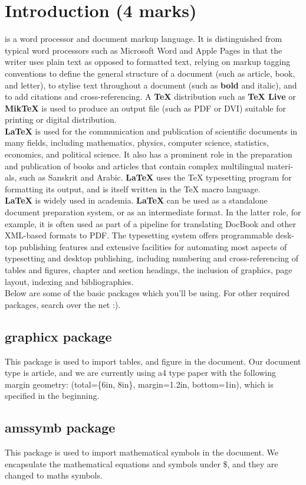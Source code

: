 \documentclass{article}
\begin{document}
\section{Introduction (4 marks)}
\large{
\hspace{5 mm}{\bfseries \LaTeX{}} is a word processor and document markup language. It is distinguished from typical word processors such as Microsoft Word and Apple Pages in that the writer uses plain text as opposed to formatted text, relying on markup tagging conventions to define the general structure of a document (such as article, book, and letter), to stylise text throughout a document (such as {\bfseries bold} and italic), and to add citations and cross-referencing. A {\bfseries \TeX{}} distribution such as {\bfseries \TeX{} Live} or {\bfseries MikTeX} is used to produce an output file (such as PDF or DVI) suitable for printing or digital distribution.\\

{\bfseries \LaTeX{}} is used for the communication and publication of scientific documents in many fields, including mathematics, physics, computer science, statistics, economics, and political science. It also has a prominent role in the preparation and publication of books and articles that contain complex multilingual materi- als, such as Sanskrit and Arabic. {\bfseries \LaTeX{}} uses the TeX typesetting program for formatting its output, and is itself written in the TeX macro language.\\

{\bfseries \LaTeX{}} is widely used in academia. {\bfseries \LaTeX{}} can be used as a standalone document preparation system, or as an intermediate format. In the latter role, for example, it is often used as part of a pipeline for translating DocBook and other XML-based formats to PDF. The typesetting system offers programmable desk- top publishing features and extensive facilities for automating most aspects of typesetting and desktop publishing, including numbering and cross-referencing of tables and figures, chapter and section headings, the inclusion of graphics, page layout, indexing and bibliographies.\\

Below are some of the basic packages which you'll be using. For other required packages, search over the net :).

\subsection{graphicx package}
This package is used to import tables, and figure in the document. Our document type is article, and we are currently using a4 type paper with the following margin geometry: (total=\{6in, 8in\}, margin=1.2in, bottom=1in), which is specified in the beginning.
\subsection{amssymb package}
This package is used to import mathematical symbols in the document. We encapsulate the mathematical equations and symbols under \$, and they are changed to maths symbols.}
\end{document}
